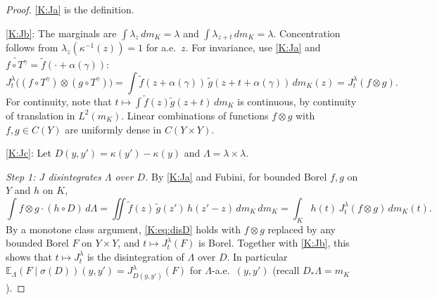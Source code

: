 \begin{proof}
\ref{K:Ja} is the definition.

\ref{K:Jb}: The marginals are $\int\lambda_z\,dm_K=\lambda$ and $\int\lambda_{z+t}\,dm_K=\lambda$.
Concentration follows from $\lambda_z(\kappa^{-1}(z))=1$ for a.e.\ $z$.
For invariance, use \ref{K:Ja} and $\widetilde{f\circ T^\gamma}=\tilde f(\cdot+\alpha(\gamma))$:
\[
J^\lambda_t\big((f\circ T^\gamma)\otimes(g\circ T^\gamma)\big)
=\int\tilde f(z+\alpha(\gamma))\,\tilde g(z+t+\alpha(\gamma))\,dm_K(z)
=J^\lambda_t(f\otimes g).
\]
For continuity, note that $t\mapsto\int\tilde f(z)\tilde g(z+t)\,dm_K$ is continuous, by
continuity of translation in $L^2(m_K)$. Linear combinations of functions $f\otimes g$ with
$f,g\in C(Y)$ are uniformly dense in $C(Y\times Y)$.

\ref{K:Jc}: Let $D(y,y')=\kappa(y')-\kappa(y)$ and $\Lambda=\lambda\times\lambda$.

\emph{Step 1: $J$ disintegrates $\Lambda$ over $D$.}
By \ref{K:Ja} and Fubini, for bounded Borel $f,g$ on $Y$ and $h$ on $K$,
\begin{equation}\label{K:eq:disD}
\int f\otimes g\cdot(h\circ D)\,d\Lambda=\iint\tilde f(z)\,\tilde g(z')\,h(z'-z)\,dm_K\,dm_K
=\int_K h(t)\,J^\lambda_t(f\otimes g)\,dm_K(t).
\end{equation}
By a monotone class argument, \eqref{K:eq:disD} holds with $f\otimes g$ replaced by any bounded
Borel $F$ on $Y\times Y$, and $t\mapsto J^\lambda_t(F)$ is Borel.
Together with \ref{K:Jb}, this shows that $t\mapsto J^\lambda_t$ is the disintegration of
$\Lambda$ over $D$. In particular $\mathbb E_\Lambda(F\mid\sigma(D))(y,y')=J^\lambda_{D(y,y')}(F)$
for $\Lambda$-a.e.\ $(y,y')$ (recall $D_*\Lambda=m_K$).


\end{proof}
